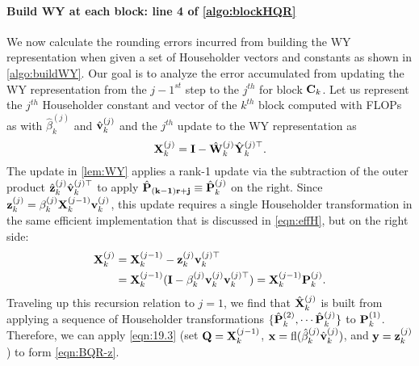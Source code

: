 \paragraph{Build WY at each block: line 4 of \cref{algo:blockHQR}}
We now calculate the rounding errors incurred from building the WY representation when given a set of Householder vectors and constants as shown in \cref{algo:buildWY}.
Our goal is to analyze the error accumulated from updating the WY representation from the $j-1^{st}$ step to the $j^{th}$ for block $\mathbf{C}_{k}$.
Let us represent the $j^{th}$ Householder constant and vector of the $k^{th}$ block computed with FLOPs as with $\hat{\beta}_k^{(j)}$ and $\hat{\mathbf{v}}_{k}^{(j)}$ and the $j^{th}$ update to the WY representation as $$\mathbf{X}_{k}^{(j)} = \mathbf{I} - \hat{\mathbf{W}}_{k}^{(j)}\hat{\mathbf{Y}}_{k}^{(j)\top}.$$ %
The update in \cref{lem:WY} applies a rank-1 update via the subtraction of the outer product $\hat{\mathbf{z}}_{k}^{(j)}\hat{\mathbf{v}}_{k}^{(j)\top}$ to apply $\hat{\mathbf{P}}_{\mathbf{(k-1)r+j}}\equiv \hat{\mathbf{P}}_k^{(j)}$ on the right. 
Since $\mathbf{z}_{k}^{(j)} = \beta_k^{(j)}\mathbf{X}_{k}^{(j-1)}\mathbf{v}_{k}^{(j)}$, this update requires a single Householder transformation in the same efficient implementation that is discussed in \cref{eqn:effH}, but on the right side:
\begin{align*}
	\bb{X}_{k}^{(j)} &=\bb{X}_{k}^{(j-1)} - \bb{z}_k^{(j)}\bb{v}_k^{(j)\top}\\ %
	&= \bb{X}_{k}^{(j-1)} (\bb{I}-\beta_k^{(j)}\bb{v}_{k}^{(j)}\bb{v}_{k}^{(j)\top})=  \bb{X}_{k}^{(j-1)}\bb{P}_{k}^{(j)}.
\end{align*}
Traveling up this recursion relation to $j=1$, we find that $\hat{\mathbf{X}}_{k}^{(j)}$ is built from applying a sequence of Householder transformations $\{\hat{\mathbf{P}}_{k}^{(2)},\cdots \hat{\mathbf{P}}_k^{(j)}\}$ to $\mathbf{P}_k^{(1)}$.
Therefore, we can apply \cref{eqn:19.3} (set $\mathbf{Q}=\mathbf{X}_{k}^{(j-1)}$, $\mathbf{x}=\mathrm{fl}(\hat{\beta}_k^{(j)}\hat{\mathbf{v}}_{k}^{(j)})$, and $\mathbf{y}=\mathbf{z}_{k}^{(j)}$) to form \cref{eqn:BQR-z}.
